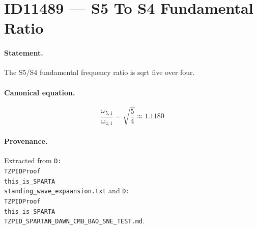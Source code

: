 \section*{ID11489 --- S5 To S4 Fundamental Ratio}

\paragraph{Statement.}
The S5/S4 fundamental frequency ratio is sqrt five over four.

\paragraph{Canonical equation.}
\[
\frac{\omega_{5,1}}{\omega_{4,1}}=\sqrt{\frac{5}{4}}\approx1.1180
\]

\paragraph{Provenance.}
Extracted from \texttt{D:\\TZPIDProof\\this\_is\_SPARTA\\standing\_wave\_expaansion.txt} and \texttt{D:\\TZPIDProof\\this\_is\_SPARTA\\TZPID\_SPARTAN\_DAWN\_CMB\_BAO\_SNE\_TEST.md}.
